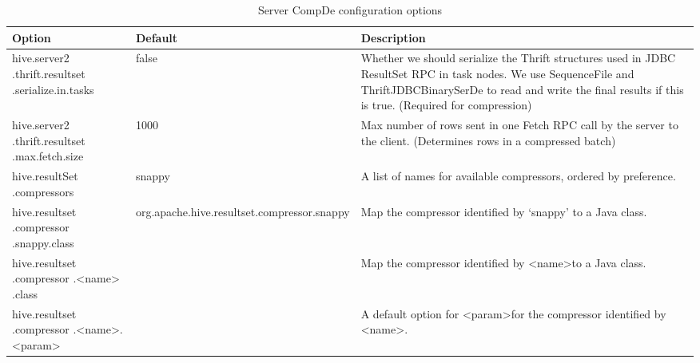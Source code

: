 \documentclass[11pt,a4paper]{article}
\begin{document}
		\begin{table}[H]
			\begin{tabular}{| p{2.7cm} | p{1.9cm} | p{6.4cm} |} \hline
				
				\textbf{Option} & \textbf{Default} & \textbf{Description} \\ \hline
				
				hive.server2\linebreak
				.thrift.resultset\linebreak
				.serialize.in.tasks
				& false
				& Whether we should serialize the Thrift structures used in JDBC ResultSet RPC in task nodes.\linebreak
				We use SequenceFile and ThriftJDBCBinarySerDe to read and write the final results if this is true.\linebreak
				(Required for compression)
				\\ \hline
				
				hive.server2\linebreak
				.thrift.resultset\linebreak
				.max.fetch.size
				& 1000
				& Max number of rows sent in one Fetch RPC call by the server to the client.\linebreak
				(Determines rows in a compressed batch)
				\\ \hline
				
				hive.resultSet\linebreak
				.compressors
				& snappy
				& A list of names for available compressors, ordered by preference.
				\\ \hline
				
				hive.resultset\linebreak
				.compressor\linebreak
				.snappy.class
				& org.apache\linebreak.hive\linebreak.resultset\linebreak.compressor\linebreak.snappy
				& Map the compressor identified by `snappy' to a Java class.
				\\ \hline
				
				hive.resultset\linebreak
				.compressor\linebreak
				.\textless name\textgreater\linebreak
				.class
				&
				& Map the compressor identified by \textless name\textgreater\space to a Java class.
				\\ \hline
				
				hive.resultset\linebreak
				.compressor\linebreak
				.\textless name\textgreater\linebreak.\textless param\textgreater
				&
				& A default option for \textless param\textgreater\space for the compressor identified by \textless name\textgreater. 
				\\ \hline
				
			\end{tabular}
			\caption{Server CompDe configuration options}
		\end{table}
		
\end{document}
